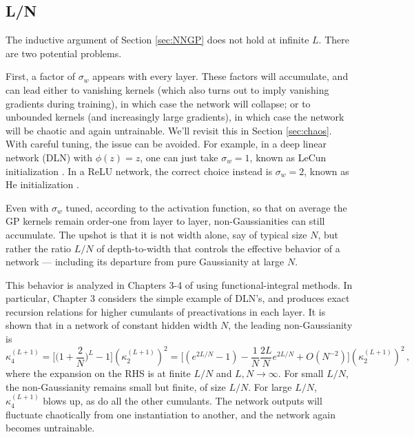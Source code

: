 \documentclass[11pt]{article}
\begin{document}
\subsection{L/N}
\label{sec:LN}

The inductive argument of Section \ref{sec:NNGP} does not hold at infinite $L$. There are two potential problems.

First, a factor of $\sigma_w$ appears with every layer. These factors will accumulate, and can lead either to vanishing kernels (which also turns out to imply vanishing gradients during training), in which case the network will collapse; or to unbounded kernels (and increasingly large gradients), in which case the network will be chaotic and again untrainable. We'll revisit this in Section \ref{sec:chaos}. With careful tuning, the issue can be avoided. For example, in a deep linear network (DLN) with $\phi(z)=z$, one can just take $\sigma_w=1$, known as LeCun initialization \cite{lecun1998efficient}. In a ReLU network, the correct choice instead is $\sigma_w=2$, known as He initialization \cite{he2015delving}.

Even with $\sigma_w$ tuned, according to the activation function, so that on average the GP kernels remain order-one from layer to layer, non-Gaussianities can still accumulate. The upshot is that it is not width alone, say of typical size $N$, but rather the ratio $L/N$ of depth-to-width that controls the effective behavior of a network --- including its departure from pure Gaussianity at large $N$.

This behavior is analyzed in Chapters 3-4 of \cite{roberts2022principles} using functional-integral methods. In particular, Chapter 3 considers the simple example of DLN's, and produces exact recursion relations for higher cumulants of preactivations in each layer. It is shown that in a network of constant hidden width $N$, the leading non-Gaussianity is
%
\begin{equation} \kappa_4^{(L+1)} = \Big[ \Big(1+\frac{2}{N}\Big)^L-1\Big](\kappa_2^{(L+1)})^2 = \Big[(e^{2L/N}-1)-\frac{1}{N}\frac{2L}{N}e^{2L/N}+O(N^{-2})\Big](\kappa_2^{(L+1)})^2\,, \end{equation}
%
where the expansion on the RHS is at finite $L/N$ and $L,N\to\infty$. For small $L/N$, the non-Gaussianity remains small but finite, of size $L/N$. For large $L/N$, $\kappa_4^{(L+1)}$ blows up, as do all the other cumulants. The network outputs will fluctuate chaotically from one instantiation to another, and the network again becomes untrainable.
\end{document}
